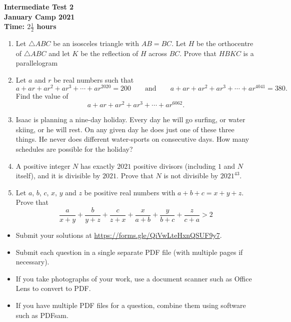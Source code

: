 \documentclass{article}
\begin{document}
\thispagestyle{empty}

\begin{center}
  \textbf{\Large Intermediate Test 2}
  \\ \vspace{1em}
  \textbf{\large January Camp 2021}
  \\ \vspace{1em}
  \textbf{\large Time: $2\frac{1}{2}$ hours}
\end{center}

\vspace{24pt}

\begin{enumerate}[1.]

\item %
Let $\triangle ABC$ be an isosceles triangle with $AB = BC$. Let $H$ be the orthocentre of $\triangle ABC$ and let $K$ be the reflection of $H$ across $BC$. Prove that $HBKC$ is a parallelogram

\item %
Let $a$ and $r$ be real numbers such that
\[ a +ar +ar^2 +ar^3 +\dotsb +ar^{2020} = 200 \qquad\text{and}\qquad a +ar +ar^2 +ar^3 +\dotsb +ar^{4041} = 380. \]
Find the value of
\[ a +ar +ar^2 +ar^3 +\dotsb +ar^{6062}. \]


\item %
Isaac is planning a nine-day holiday. Every day he will go surfing, or water skiing, or he will rest. On any given day he does just one of these three things. He never does different water-sports on consecutive days. How many schedules are possible for the holiday?

\item %
A positive integer $N$ has exactly $2021$ positive divisors (including $1$ and $N$ itself), and it is divisible by $2021$.
Prove that $N$ is not divisible by $2021^{43}$.


\item %
Let $a$, $b$, $c$, $x$, $y$ and $z$ be positive real numbers with $a + b + c = x + y + z$. Prove that 
$$\frac{a}{x + y} + \frac{b}{y + z} + \frac{c}{z + x} + \frac{x}{a + b} + \frac{y}{b + c} + \frac{z}{c + a} > 2 $$


\end{enumerate}


\vfill
\begin{itemize}
	\item Submit your solutions at \url{https://forms.gle/QiVwLteHxnQSUF9y7}.
	\item Submit each question in a single separate PDF file (with multiple pages if necessary).
	\item If you take photographs of your work, use a document scanner such as Office Lens to convert to PDF.
	\item If you have multiple PDF files for a question, combine them using software such as PDFsam.
\end{itemize}

\vfill
\centering
\begin{BVerbatim}
\end{BVerbatim}
\end{document}
